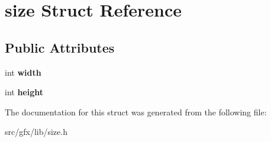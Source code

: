\hypertarget{structsize}{}\section{size Struct Reference}
\label{structsize}
\subsection*{Public Attributes}
\begin{DoxyCompactItemize}
\item 
\mbox{\label{structsize_afd8efe4755a96dfc77d03cb9bc02eb62}} 
int {\bfseries width}
\item 
\mbox{\label{structsize_a0ce404630bf4cf87ce2d02f2db8b6c93}} 
int {\bfseries height}
\end{DoxyCompactItemize}


The documentation for this struct was generated from the following file\+:\begin{DoxyCompactItemize}
\item 
src/gfx/lib/size.\+h\end{DoxyCompactItemize}

